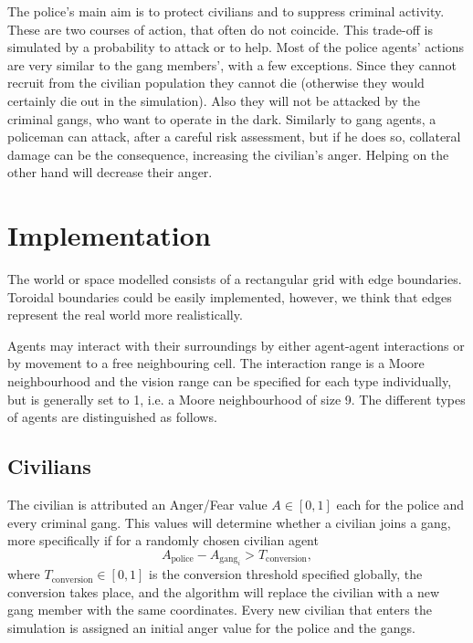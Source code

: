 \documentclass[11pt]{article}
\begin{document}
The police's main aim is to protect civilians and to suppress criminal activity. These are two courses of action, that often do not coincide. This trade-off is simulated by a probability to attack or to help. Most of the police agents' actions are very similar to the gang members', with a few exceptions. Since they cannot recruit from the civilian population they cannot die (otherwise they would certainly die out in the simulation). Also they will not be attacked by the criminal gangs, who want to operate in the dark. Similarly to gang agents, a policeman can attack, after a careful risk assessment, but if he does so, collateral damage can be the consequence, increasing the civilian's anger. Helping on the other hand will decrease their anger. 

  
\section{Implementation}
The world or space modelled consists of a rectangular grid with edge boundaries. Toroidal boundaries could be easily implemented, however, we think that edges represent the real world more realistically.

Agents may interact with their surroundings by either agent-agent interactions or by movement to a free neighbouring cell. The interaction range is a Moore neighbourhood and the vision range can be specified for each type individually, but is generally set to 1, i.e. a Moore neighbourhood of size 9. The different types of agents are distinguished as follows.

\subsection{Civilians}

The civilian is attributed an Anger/Fear value $A \in [0,1]$ each for the police and every criminal gang. This values will determine whether a civilian joins a gang, more specifically if for a randomly chosen civilian agent
\begin{equation}
A_{\text{police}}-A_{\text{gang}_i}>T_{\text{conversion}},\label{angerdiff}
\end{equation}
where $T_{\text{conversion}} \in [0,1]$ is the conversion threshold specified globally, the conversion takes place, and the algorithm will replace the civilian with  
a new gang member with the same coordinates. Every new civilian that enters the simulation is assigned an initial anger value for the police and the gangs.
\end{document}

